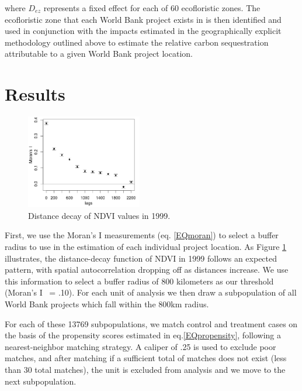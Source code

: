 \documentclass{article}\usepackage[]{graphicx}\usepackage[]{color}
\newenvironment{knitrout}{}{}  %
\begin{document}
\begin{knitrout}
where \begin{math}D_{ez}\end{math} represents a fixed effect for each of 60 ecofloristic zones.  
The ecofloristic zone that each World Bank project exists in is then identified and used in conjunction with the impacts estimated in the geographically explicit methodology outlined above to estimate the relative carbon sequestration attributable to a given World Bank project location.

\newpage
\section{Results}

\begin{figure}
\centering
 \includegraphics[width=0.45\textwidth]{pre_avg_NDVI_max_full}
\caption{Distance decay of NDVI values in 1999.}
  \label{DDFig}
\end{figure}

First, we use the Moran's I measurements (eq. \ref{EQmoran}) to select a buffer radius to use in the estimation of each individual project location.
As Figure \ref{DDFig} illustrates, the distance-decay function of NDVI in 1999 follows an expected pattern, with spatial autocorrelation dropping off as distances increase.  
We use this information to select a buffer radius of 800 kilometers as our threshold (Moran's I ~= .10).  
For each unit of analysis we then draw a subpopulation of all World Bank projects which fall within the 800km radius.

\par
For each of these 13769 subpopulations, we match control and treatment cases on the basis of the propensity scores estimated in eq.\ref{EQpropensity}, following a nearest-neighbor matching strategy.  
A caliper of .25 is used to exclude poor matches, and after matching if a sufficient total of matches does not exist (less than 30 total matches), the unit is excluded from analysis and we move to the next subpopulation. 
\par


\end{knitrout}
\end{document}
